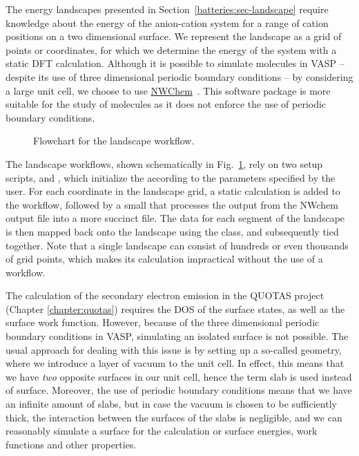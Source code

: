 \begin{refsection}

The energy landscapes presented in Section~\ref{batteries:sec-landscape} require 
knowledge about the energy of the anion-cation system for a range of cation 
positions on a two dimensional surface. We represent the landscape as a grid of 
points or coordinates, for which we determine the energy of the system with a 
static DFT calculation. Although it is possible to simulate molecules in VASP 
-- despite its use of three dimensional periodic boundary conditions -- by 
considering a large unit cell, we choose to use 
\href{http://www.nwchem-sw.org/index.php/Main_Page}{NWChem}~\cite{Valiev2010}. 
This software package is more suitable for the study of molecules as it does 
not enforce the use of periodic boundary conditions. 

\begin{figure}[ht] 
 
\caption{Flowchart for the landscape workflow.} 
\label{automation:fig-landscape} 
\end{figure} 

The landscape workflows, shown schematically in Fig.~\ref{automation:fig-landscape}, 
rely on two setup scripts,  and , which 
initialize the  according to the parameters specified by the 
user. For each coordinate in the landscape grid, a static calculation is added 
to the workflow, followed by a small  that processes the output 
from the NWchem output file into a more succinct  file. The data for
each segment of the landscape is then mapped back onto the landscape using the 
 class, and subsequently tied together. Note that a single 
landscape can consist of hundreds or even thousands of grid points, which makes 
its calculation impractical without the use of a workflow.

 
The calculation of the secondary electron emission in the QUOTAS project 
(Chapter \ref{chapter:quotas}) requires the DOS of the surface states, as well 
as the surface work function. However, because of the three dimensional 
periodic boundary conditions in VASP, simulating an isolated surface 
is not possible. The usual approach for dealing with this issue is by setting 
up a so-called  geometry, where we introduce a layer of vacuum to 
the unit cell. In effect, this means that we have \textit{two} opposite 
surfaces in our unit cell, hence the term slab is used instead of surface. 
Moreover, the use of periodic boundary conditions means that we have an 
infinite amount of slabs, but in case the vacuum is chosen to be sufficiently 
thick, the interaction between the surfaces of the slabs is negligible, and we 
can reasonably simulate a surface for the calculation or surface energies, 
work functions and other properties.  
 

\end{refsection}
